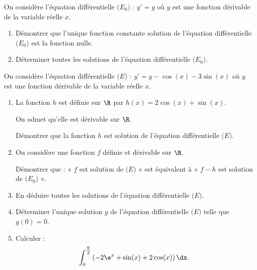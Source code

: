 On considère l'équation différentielle $\big(E_0\big)$ : $y'=y$ où $y$ est une fonction dérivable de la variable réelle $x$.

\begin{enumerate}
	\item Démontrer que l'unique fonction constante solution de l'équation différentielle $\big(E_0\big)$ est la fonction nulle.
	\item Déterminer toutes les solutions de l'équation différentielle $\big(E_0\big)$.
\end{enumerate}

On considère l'équation différentielle $\big(E\big)$ : $y'=y-\cos(x)-3\sin(x)$ où $y$ est une fonction dérivable de la variable réelle $x$.

\begin{enumerate}[resume]
	\item La fonction $h$ est définie sur $\R$ par $h(x) = 2\cos(x) + \sin(x)$.
	
	On admet qu'elle est dérivable sur $\R$.
	
	Démontrer que la fonction $h$ est solution de l'équation différentielle $\big(E\big)$.
	\item On considère une fonction $f$ définie et dérivable sur $\R$.
	
	Démontrer que : « $f$ est solution de $\big(E\big)$ » est équivalent à « $f-h$ est solution de $\big(E_0\big)$ ».
	\item En déduire toutes les solutions de l'équation différentielle $\big(E\big)$.
	\item Déterminer l'unique solution $g$ de l'équation différentielle $\big(E\big)$ telle que $g(0) = 0$.
	\item Calculer : \[ \int_{0}^{\tfrac{\pi}{2}} \left(-2\e^{x}+\sin(x)+2\cos(x)\right)\dx. \]
\end{enumerate}